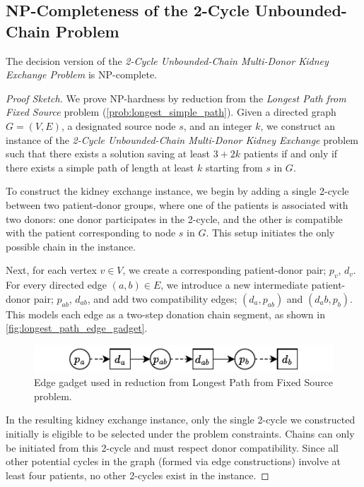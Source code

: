 \subsection{NP-Completeness of the 2-Cycle Unbounded-Chain Problem}

\begin{lemma}
The decision version of the \textit{2-Cycle Unbounded-Chain Multi-Donor Kidney Exchange Problem} is NP-complete.
\end{lemma}

\begin{proof}[Proof Sketch]
We prove NP-hardness by reduction from the \textit{Longest Path from Fixed Source} problem (\autoref{prob:longest_simple_path}). Given a directed graph $G = (V, E)$, a designated source node $s$, and an integer $k$, we construct an instance of the \textit{2-Cycle Unbounded-Chain Multi-Donor Kidney Exchange} problem such that there exists a solution saving at least $3 + 2k$ patients if and only if there exists a simple path of length at least $k$ starting from $s$ in $G$.

To construct the kidney exchange instance, we begin by adding a single 2-cycle between two patient-donor groups, where one of the patients is associated with two donors: one donor participates in the 2-cycle, and the other is compatible with the patient corresponding to node $s$ in $G$. This setup initiates the only possible chain in the instance.

Next, for each vertex $v \in V$, we create a corresponding patient-donor pair; $p_v$, $d_v$. For every directed edge $(a, b) \in E$, we introduce a new intermediate patient-donor pair; $p_{ab}$, $d_{ab}$, and add two compatibility edges; $(d_a, p_{ab})$ and $(d_ab, p_b)$. This models each edge as a two-step donation chain segment, as shown in \autoref{fig:longest_path_edge_gadget}.


\begin{figure}
    \centering
    \includegraphics{data/longest_path_edge_gadget.pdf}
    \caption[Edge gadget used in reduction from Longest Path from Fixed Source problem.]{Edge gadget used in reduction from Longest Path from Fixed Source problem.}
    \label{fig:longest_path_edge_gadget}
\end{figure}


In the resulting kidney exchange instance, only the single 2-cycle we constructed initially is eligible to be selected under the problem constraints. Chains can only be initiated from this 2-cycle and must respect donor compatibility. Since all other potential cycles in the graph (formed via edge constructions) involve at least four patients, no other 2-cycles exist in the instance.


\end{proof}
